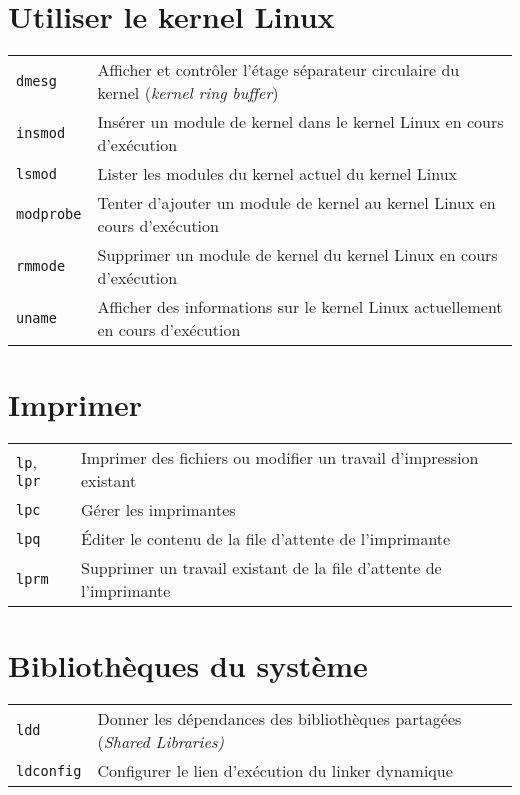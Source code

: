 \documentclass[10pt,a4paper]{article}
\begin{document}
\begin{multicols}{2}
\section{Utiliser le kernel Linux}
\begin{tabular}{ p{2.5cm} p{8.5cm} }
  \hline
  \texttt{dmesg} & Afficher et contrôler l'étage séparateur circulaire du kernel (\textit{kernel ring buffer})\\
  \rowcolor{Gray}
  \texttt{insmod} & Insérer un module de kernel dans le kernel Linux en cours d'exécution\\
  \texttt{lsmod} & Lister les modules du kernel actuel du kernel Linux\\
  \rowcolor{Gray}
  \texttt{modprobe} & Tenter d'ajouter un module de kernel au kernel Linux en cours d'exécution\\
  \texttt{rmmode} & Supprimer un module de kernel du kernel Linux en cours d'exécution \\
  \rowcolor{Gray}
  \texttt{uname} & Afficher des informations sur le kernel Linux actuellement en cours d'exécution\\
  \hline
\end{tabular}

\section{Imprimer}
\begin{tabular}{ p{2.5cm} p{8.5cm} }
  \hline
  \texttt{lp}, \texttt{lpr} & Imprimer des fichiers ou modifier un travail \newline d'impression existant\\
  \rowcolor{Gray}
  \texttt{lpc} & Gérer les imprimantes \\
  \texttt{lpq} & Éditer le contenu de la file d'attente de l'imprimante\\
  \rowcolor{Gray}
  \texttt{lprm} & Supprimer un travail existant de la file d'attente de l'imprimante \\
  \hline
\end{tabular}

\section{Bibliothèques du système}

\begin{tabular}{ p{2.5cm} p{8.5cm} }
  \hline 
  \texttt{ldd} & Donner les dépendances des bibliothèques partagées (\textit{Shared Libraries)} \\
  \rowcolor{Gray}
  \texttt{ldconfig} & Configurer le lien d'exécution du linker dynamique \\
  \hline
\end{tabular}


\end{multicols}
\end{document}
